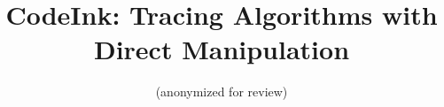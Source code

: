 \documentclass{sigchi}
\begin{document}
\title{CodeInk: Tracing Algorithms with Direct Manipulation}


\author{
(anonymized for review)
}

\author{
  \alignauthor \hspace{10pt} \\
    \affaddr{\hspace{10pt}}\\
    \affaddr{\hspace{10pt}}\\
    \email{\hspace{10pt}}\\
    \affaddr{\hspace{10pt}}
  \alignauthor \hspace{10pt} \\
    \affaddr{\hspace{10pt}}\\
    \affaddr{\hspace{10pt}}\\
    \email{\hspace{10pt}}\\
    \affaddr{\hspace{10pt}}
  \alignauthor \hspace{10pt} \\
    \affaddr{\hspace{10pt}}\\
    \affaddr{\hspace{10pt}}\\
    \email{\hspace{10pt}}\\
    \affaddr{\hspace{10pt}}
}

\begin{comment}
\author{
  \alignauthor Jeremy Scott\\
    \affaddr{MIT CSAIL}\\
    \affaddr{Cambridge, MA 02139}\\
    \email{jscott@csail.mit.edu}
  \alignauthor Philip J. Guo\\
    \affaddr{MIT CSAIL / University of Rochester}\\
    \affaddr{Cambridge, MA 02139}\\
    \email{pg@cs.rochester.edu}
  \alignauthor Randall Davis\\
    \affaddr{MIT CSAIL}\\
    \affaddr{Cambridge, MA 02139}\\
    \email{davis@csail.mit.edu}
}
\end{comment}
\end{document}
